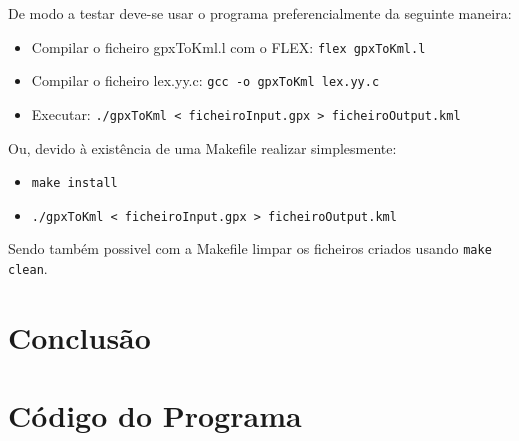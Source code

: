 \documentclass{llncs}
\begin{document}
De modo a testar deve-se usar o programa preferencialmente da seguinte maneira:
\begin{itemize}
    \item Compilar o ficheiro gpxToKml.l com o FLEX: \verb|flex gpxToKml.l|
    \item Compilar o ficheiro lex.yy.c: \verb|gcc -o gpxToKml lex.yy.c|
    \item Executar: \verb|./gpxToKml < ficheiroInput.gpx > ficheiroOutput.kml|
\end{itemize}

Ou, devido à existência de uma Makefile realizar simplesmente:
\begin{itemize}
    \item \verb|make install|
    \item \verb|./gpxToKml < ficheiroInput.gpx > ficheiroOutput.kml|
\end{itemize}

Sendo também possivel com a Makefile limpar os ficheiros criados usando \verb|make clean|.

\section{Conclusão}

\appendix
\section{Código do Programa}
\end{document}
